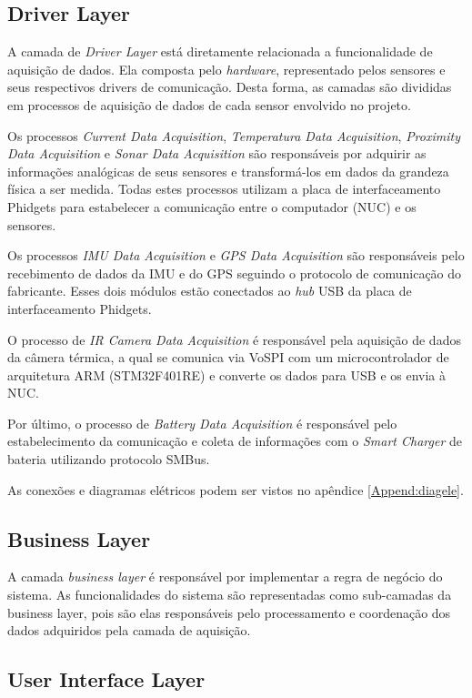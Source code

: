 \subsection{Driver Layer}
	
A camada de \textit{Driver Layer} está diretamente relacionada a funcionalidade de aquisição de dados. Ela composta pelo \textit{hardware}, representado pelos sensores e seus respectivos drivers de comunicação. Desta forma, as camadas são divididas em processos de aquisição de dados de cada sensor envolvido no projeto.

Os processos \textit{Current Data Acquisition}, \textit{Temperatura Data Acquisition}, \textit{Proximity Data Acquisition} e \textit{Sonar Data Acquisition} são responsáveis por adquirir as informações analógicas de seus sensores e transformá-los em dados da grandeza física a ser medida. Todas estes processos utilizam a placa de interfaceamento Phidgets para estabelecer a comunicação entre o computador (NUC) e os sensores.

Os processos \textit{IMU Data Acquisition} e \textit{GPS Data Acquisition} são responsáveis pelo recebimento de dados da IMU e do GPS seguindo o protocolo de comunicação do fabricante. Esses dois módulos estão conectados ao \textit{hub} USB da placa de interfaceamento Phidgets. 

O processo de \textit{IR Camera Data Acquisition} é responsável pela aquisição de dados da câmera térmica, a qual se comunica via VoSPI com um microcontrolador de arquitetura ARM (STM32F401RE) e converte os dados para USB e os envia à NUC. 

Por último, o processo de \textit{Battery Data Acquisition} é responsável pelo estabelecimento da comunicação e coleta de informações com o \textit{Smart Charger} de bateria utilizando protocolo SMBus.

As conexões e diagramas elétricos podem ser vistos no apêndice \ref{Append:diagele}.

\subsection{Business Layer}

A camada \textit{business layer} é responsável por implementar a regra de negócio do sistema. As funcionalidades do sistema são representadas como sub-camadas da business layer, pois são elas responsáveis pelo processamento e coordenação dos dados adquiridos pela camada de aquisição.

\subsection{User Interface Layer}

